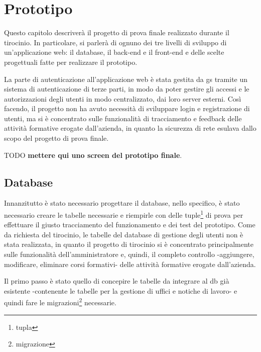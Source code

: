 \chapter{Prototipo}\label{ch:prototipo}
Questo capitolo descriverà il progetto di prova finale realizzato durante il tirocinio. In particolare, si parlerà di ognuno dei tre livelli di sviluppo di un'applicazione web: il database, il back-end e il front-end e delle scelte progettuali fatte per realizzare il prototipo.

La parte di autenticazione all'applicazione web è stata gestita da \acrfull{gs} tramite un sistema di autenticazione di terze parti, in modo da poter gestire gli accessi e le autorizzazioni degli utenti in modo centralizzato, dai loro server esterni. Così facendo, il progetto non ha avuto necessità di sviluppare login e registrazione di utenti, ma si è concentrato sulle funzionalità di tracciamento e feedback delle attività formative erogate dall'azienda, in quanto la sicurezza di rete esulava dallo scopo del progetto di prova finale.\newline

TODO {\textbf{ mettere qui uno screen del prototipo finale}.}

\newpage
\section{Database}\label{sec:database}
Innanzitutto è stato necessario progettare il database, nello specifico, è stato necessario creare le tabelle necessarie e riempirle con delle tuple\footnote{\glsdesc{tupla}} di prova per effettuare il giusto tracciamento del funzionamento e dei test del prototipo. 
Come da richiesta del tirocinio, le tabelle del database di gestione degli utenti non è stata realizzata, in quanto il progetto di tirocinio si è concentrato principalmente sulle funzionalità dell'amministratore e, quindi, il completo controllo -aggiungere, modificare, eliminare corsi formativi- delle attività formative erogate dall'azienda.

Il primo passo è stato quello di concepire le tabelle da integrare al \acrshort{db} già esistente -contenente le tabelle per la gestione di uffici e notiche di lavoro- e quindi fare le migrazioni\footnote{\glsdesc{migrazione}} necessarie. 

